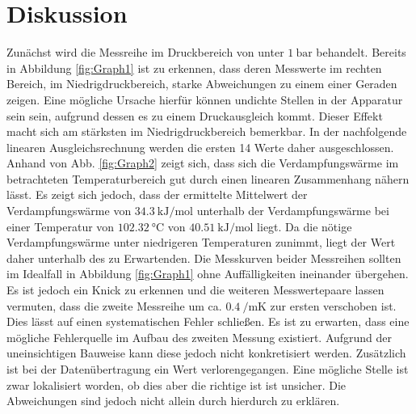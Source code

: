 
\section{Diskussion}
\label{sec:Diskussion}
Zunächst wird die Messreihe im Druckbereich von unter $\SI{1}{\bar}$
 behandelt. Bereits in Abbildung \ref{fig:Graph1} ist zu erkennen, dass deren Messwerte im
  rechten Bereich, im Niedrigdruckbereich, starke Abweichungen zu einem einer Geraden zeigen. Eine mögliche Ursache hierfür können
  undichte Stellen in der Apparatur sein sein, aufgrund dessen es zu einem
   Druckausgleich kommt. Dieser Effekt macht sich am stärksten im
   Niedrigdruckbereich bemerkbar. In der nachfolgende linearen Ausgleichsrechnung
    werden die ersten 14 Werte daher ausgeschlossen. Anhand von Abb.
     \ref{fig:Graph2} zeigt sich, dass sich die Verdampfungswärme im betrachteten
      Temperaturbereich gut durch einen linearen Zusammenhang nähern lässt. Es zeigt sich jedoch, dass der
      ermittelte Mittelwert der Verdampfungswärme von $\SI{34.3}{\kilo\joule\per\mol}$ unterhalb der Verdampfungswärme bei einer
       Temperatur von $\SI{102.32}{\degreeCelsius}$ von $\SI{40.51}{\kilo\joule\per\mol}$ \cite{WasserTab} liegt. Da die nötige
       Verdampfungswärme unter niedrigeren Temperaturen zunimmt, liegt der Wert
        daher unterhalb des zu Erwartenden. Die Messkurven beider
          Messreihen sollten im Idealfall in Abbildung \ref{fig:Graph1} ohne Auffälligkeiten ineinander übergehen.
           Es ist jedoch ein Knick zu erkennen und die weiteren Messwertepaare lassen vermuten, dass die zweite Messreihe um ca.
           $\SI{0.4}{\per\milli\kelvin}$ zur ersten verschoben ist. Dies lässt auf einen systematischen Fehler schließen. Es ist zu erwarten, dass eine mögliche
              Fehlerquelle im Aufbau des zweiten Messung existiert. Aufgrund der
               uneinsichtigen Bauweise kann diese jedoch nicht konkretisiert werden. 
               Zusätzlich ist bei der Datenübertragung ein Wert verlorengegangen. 
               Eine mögliche Stelle ist zwar lokalisiert worden, ob dies aber die richtige ist ist unsicher.
                Die Abweichungen sind jedoch nicht allein durch hierdurch zu erklären.
